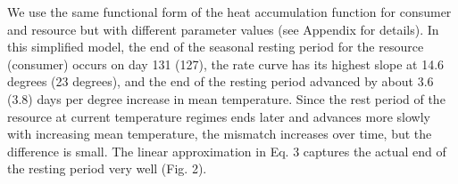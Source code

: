 \documentclass[11pt,letterpaper]{article}
\begin{document}
We use the same functional form of the heat accumulation function for consumer and resource but with different parameter values (see Appendix for details). In this simplified model, the end of the seasonal resting period for the resource (consumer) occurs on day 131 (127), the rate curve has its highest slope at 14.6 degrees (23 degrees), and the end of the resting period advanced by about 3.6 (3.8) days per degree increase in mean temperature. Since the rest period of the resource at current temperature regimes ends later and advances more slowly with increasing mean temperature, the mismatch increases over time, but the difference is small. The linear approximation in Eq. 3 captures the actual end of the resting period very well (Fig. 2).
\end{document}

